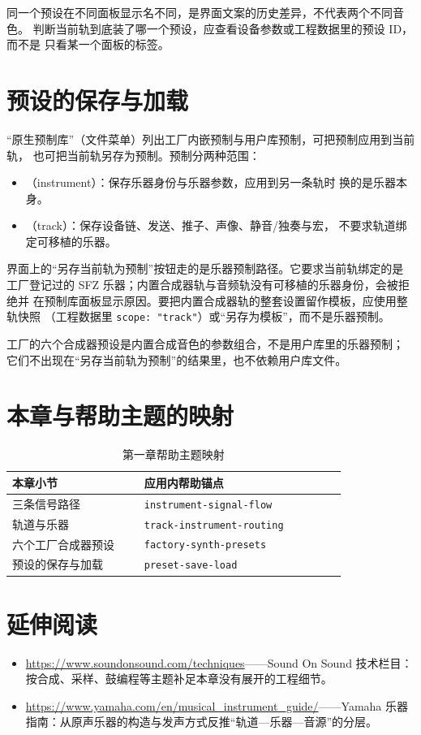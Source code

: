 同一个预设在不同面板显示名不同，是界面文案的历史差异，不代表两个不同音色。
判断当前轨到底装了哪一个预设，应查看设备参数或工程数据里的预设 ID，而不是
只看某一个面板的标签。

\section{预设的保存与加载}

“原生预制库”（文件菜单）列出工厂内嵌预制与用户库预制，可把预制应用到当前轨，
也可把当前轨另存为预制。预制分两种范围：

\begin{itemize}
  \item {}（instrument）：保存乐器身份与乐器参数，应用到另一条轨时
        换的是乐器本身。
  \item {}（track）：保存设备链、发送、推子、声像、静音/独奏与宏，
        不要求轨道绑定可移植的乐器。
\end{itemize}

界面上的“另存当前轨为预制”按钮走的是乐器预制路径。它要求当前轨绑定的是
工厂登记过的 SFZ 乐器；内置合成器轨与音频轨没有可移植的乐器身份，会被拒绝并
在预制库面板显示原因。要把内置合成器轨的整套设置留作模板，应使用整轨快照
（工程数据里 \texttt{scope: "track"}）或“另存为模板”，而不是乐器预制。

工厂的六个合成器预设是内置合成音色的参数组合，不是用户库里的乐器预制；
它们不出现在“另存当前轨为预制”的结果里，也不依赖用户库文件。

\section{本章与帮助主题的映射}

\begin{table}[htbp]
\centering
\small
\begin{tabular}{@{}p{0.34\linewidth}p{0.52\linewidth}@{}}
\hline
本章小节 & 应用内帮助锚点 \\
\hline
三条信号路径 & \texttt{instrument-signal-flow} \\
轨道与乐器 & \texttt{track-instrument-routing} \\
六个工厂合成器预设 & \texttt{factory-synth-presets} \\
预设的保存与加载 & \texttt{preset-save-load} \\
\hline
\end{tabular}
\caption{第一章帮助主题映射}
\end{table}

\section*{延伸阅读}
\begin{itemize}[leftmargin=1.5em]
\item \url{https://www.soundonsound.com/techniques}——Sound On Sound 技术栏目：按合成、采样、鼓编程等主题补足本章没有展开的工程细节。
\item \url{https://www.yamaha.com/en/musical_instrument_guide/}——Yamaha 乐器指南：从原声乐器的构造与发声方式反推“轨道—乐器—音源”的分层。
\end{itemize}
